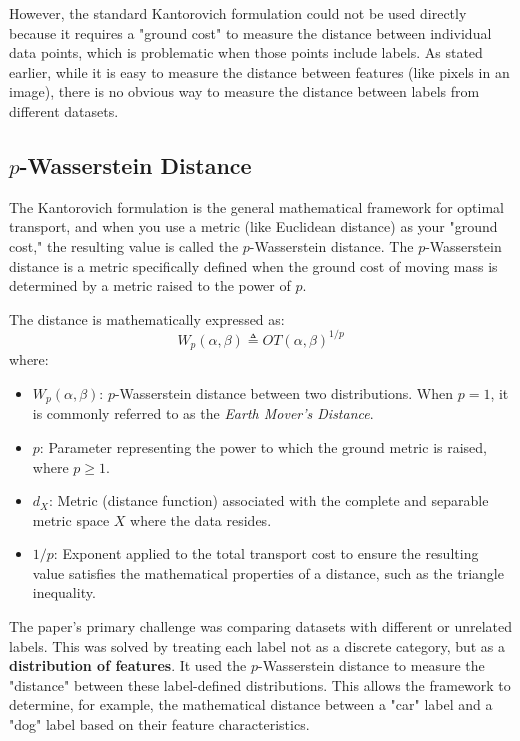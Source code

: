 \documentclass[11pt, a4paper]{article}
\theoremstyle{plain} %
\theoremstyle{definition} %
\begin{document}
			However, the standard Kantorovich formulation could not be used directly because it requires a "ground cost" to measure the distance between individual data points, which is problematic when those points include labels. As stated earlier, while it is easy to measure the distance between features (like pixels in an image), there is no obvious way to measure the distance between labels from different datasets.


		\subsection{$p$-Wasserstein Distance}
		\label{sec:p_wasserstein_distance}
			The Kantorovich formulation is the general mathematical framework for optimal transport, and when you use a metric (like Euclidean distance) as your "ground cost," the resulting value is called the $p$-Wasserstein distance. The $p$-Wasserstein distance is a metric specifically defined when the ground cost of moving mass is determined by a metric raised to the power of $p$.

			The distance is mathematically expressed as:
			\begin{equation}
				\label{eq:p_wasserstein}
				W_p(\alpha, \beta) \triangleq OT(\alpha, \beta)^{1/p}
			\end{equation}
			where:
			\begin{itemize}
				\item $W_p(\alpha, \beta)$: $p$-Wasserstein distance between two distributions. When $p=1$, it is commonly referred to as the \textit{Earth Mover's Distance}.
				\item $p$: Parameter representing the power to which the ground metric is raised, where $p \ge 1$.
				\item $d_X$: Metric (distance function) associated with the complete and separable metric space $X$ where the data resides.
				\item $1/p$: Exponent applied to the total transport cost to ensure the resulting value satisfies the mathematical properties of a distance, such as the triangle inequality.
			\end{itemize}
			The paper's primary challenge was comparing datasets with different or unrelated labels. This was solved by treating each label not as a discrete category, but as a \textbf{distribution of features}. It used the $p$-Wasserstein distance to measure the "distance" between these label-defined distributions. This allows the framework to determine, for example, the mathematical distance between a "car" label and a "dog" label based on their feature characteristics.
\end{document}
